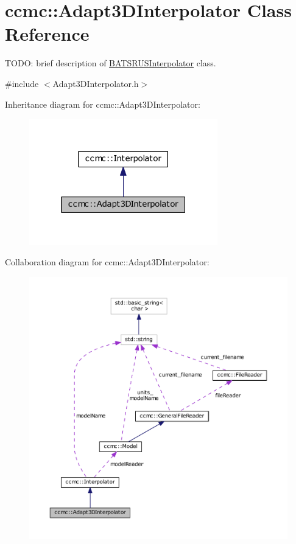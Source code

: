 \hypertarget{classccmc_1_1_adapt3_d_interpolator}{\section{ccmc\-:\-:Adapt3\-D\-Interpolator Class Reference}
\label{classccmc_1_1_adapt3_d_interpolator}
}


T\-O\-D\-O\-: brief description of \hyperlink{classccmc_1_1_b_a_t_s_r_u_s_interpolator}{B\-A\-T\-S\-R\-U\-S\-Interpolator} class.  




{\ttfamily \#include $<$Adapt3\-D\-Interpolator.\-h$>$}



Inheritance diagram for ccmc\-:\-:Adapt3\-D\-Interpolator\-:
\nopagebreak
\begin{figure}[H]
\begin{center}
\leavevmode
\includegraphics[width=232pt]{classccmc_1_1_adapt3_d_interpolator__inherit__graph}
\end{center}
\end{figure}


Collaboration diagram for ccmc\-:\-:Adapt3\-D\-Interpolator\-:
\nopagebreak
\begin{figure}[H]
\begin{center}
\leavevmode
\includegraphics[width=350pt]{classccmc_1_1_adapt3_d_interpolator__coll__graph}
\end{center}
\end{figure}
